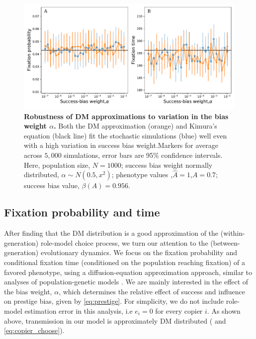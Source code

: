 \documentclass[12pt]{extarticle}
\begin{document}
\begin{figure}
    \includegraphics[width=\linewidth]{../figures/final/full_vs_dm_changing_alpha.pdf}
   \caption{\textbf{Robustness of DM approximations to variation in the bias weight $\alpha$.} 
   Both the DM approximation (orange) and Kimura's equation (black line) fit the stochastic simulations (blue) well even with a high variation in success bias weight.Markers for average across $5,000$ simulations, error bars are 95\% confidence intervals.
  Here, population size, $N=1000$; success bias weight normally distributed, $\alpha\sim N(0.5,x^2)$; phenotype values ,$\hat{A}=1$,$A=0.7$; success bias value, $\beta(A)=0.956$.}	
  \label{fig:hetro_alpha}
\end{figure}


\subsection*{Fixation probability and time}

After finding that the DM distribution is a good approximation of the (within-generation) role-model choice process, we turn our attention to the (between-generation) evolutionary dynamics.
We focus on the fixation probability and conditional fixation time (conditioned on the population reaching fixation) of a favored phenotype, using a diffusion-equation approximation approach, similar to analyses of population-genetic models \citep{kimura,kimura_average,otto_fixation}.
We are mainly interested in the effect of the bias weight, $\alpha$, which determines the relative effect of success and influence on prestige bias, given by \cref{eq:prestige}.
For simplicity, we do not include role-model estimation error in this analysis, i.e $e_i=0$ for every copier $i$.
As shown above, transmission in our model is approximately DM distributed ( and \cref{eq:copier_choose}).
\end{document}
